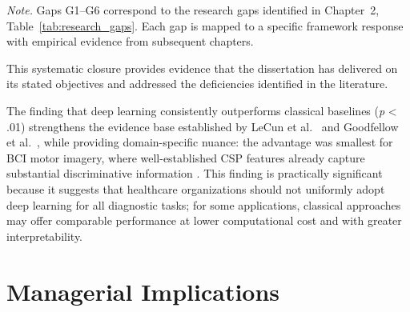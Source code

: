 \vspace{0.5em}\noindent\textit{Note.} Gaps G1--G6 correspond to the research gaps identified in Chapter~2, Table~\ref{tab:research_gaps}. Each gap is mapped to a specific framework response with empirical evidence from subsequent chapters.

This systematic closure provides evidence that the dissertation has delivered on its stated objectives and addressed the deficiencies identified in the literature.

The finding that deep learning consistently outperforms classical baselines (\textit{p} < .01) strengthens the evidence base established by LeCun et al.~\cite{lecun2015deep} and Goodfellow et al.~\cite{goodfellow2016deep}, while providing domain-specific nuance: the advantage was smallest for BCI motor imagery, where well-established CSP features already capture substantial discriminative information \cite{pfurtscheller1999bci}. This finding is practically significant because it suggests that healthcare organizations should not uniformly adopt deep learning for all diagnostic tasks; for some applications, classical approaches may offer comparable performance at lower computational cost and with greater interpretability.

\section{Managerial Implications}
\label{app_j:managerial}

